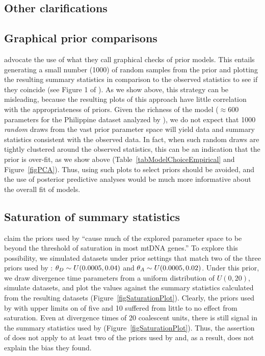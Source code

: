 \documentclass[letterpaper,12pt]{article}
\begin{document}
\begin{linenumbers}
\section*{Other clarifications}

\subsection*{Graphical prior comparisons}
\citet{Hickerson2013} advocate the use of what they call graphical checks of
prior models.
This entails generating a small number (1000) of random samples from the prior
and plotting the resulting summary statistics in comparison to the observed
statistics to see if they coincide (see Figure 1 of \citet{Hickerson2013}).
As we show above, this strategy can be misleading, because the resulting plots
of this approach have little correlation with the appropriateness of priors.
Given the richness of the \msb model ($\approx 600$ parameters for the Philippine
dataset analyzed by \citet{Hickerson2013}), we do not expect that 1000
\emph{random} draws from the vast prior parameter space will yield data and
summary statistics consistent with the observed data.
In fact, when such random draws are tightly clustered around the observed
statistics, this can be an indication that the prior is over-fit, as we show
above (Table~\ref{tabModelChoiceEmpirical} and Figure~\ref{figPCA}).
Thus, using such plots to select priors should be avoided, and the use of
posterior predictive analyses would be much more informative about the overall
fit of models.

\subsection*{Saturation of summary statistics}
\citet{Hickerson2013} claim the priors used by \citet{Oaks2012} ``cause much of
the explored parameter space to be beyond the threshold of saturation in most
mtDNA genes.'' To explore this possibility, we simulated datasets under prior
settings that match two of the three priors used by \citet{Oaks2012}:
$\meanDescendantTheta{} \sim U(0.0005, 0.04)$ and $\ancestralTheta{} \sim
U(0.0005, 0.02)$.
Under this prior, we draw divergence time parameters from a uniform
distribution of $U(0, 20)$, simulate datasets, and plot the \divt{} values
against the summary statistics calculated from the resulting datasets
(Figure~\ref{figSaturationPlot}).
Clearly, the priors used by \citet{Oaks2012} with upper limits on \divt{} of five
and 10 suffered from little to no effect from saturation.
Even at divergence times of 20 coalescent units, there is still signal in the
summary statistics used by \msb (Figure~\ref{figSaturationPlot}).
Thus, the assertion of \citet{Hickerson2013} does not apply to at least
two of the priors used by \citet{Oaks2012} and, as a result, does not
explain the bias they found.




\end{linenumbers}
\end{document}
